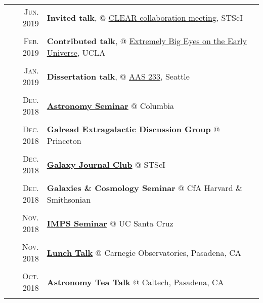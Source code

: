 \documentclass[letterpaper,10pt]{article}
\newcommand{\textwrap}{5.8in}       %
\begin{document}
\begin{longtable}{r|p{\textwrap}}
    \textsc{Jun. 2019}   &   \textbf{Invited talk}, @ \href{https://sites.google.com/view/clearhst19/home}{CLEAR collaboration meeting}, STScI \\
    \multicolumn{2}{c}{} \\

    \textsc{Feb. 2019}   &   \textbf{Contributed talk}, @ \href{https://conferences.pa.ucla.edu/early-universe-2019/agenda.html}{Extremely Big Eyes on the Early Universe}, UCLA  \\
    \multicolumn{2}{c}{} \\

    \textsc{Jan. 2019}   &   \textbf{Dissertation talk}, @ \href{https://aas.org/meetings/aas233}{AAS 233}, Seattle    \\
    \multicolumn{2}{c}{} \\

    \textsc{Dec. 2018}   &   \href{http://www.astro.columbia.edu/event?eid=584}{\textbf{Astronomy Seminar}} @ Columbia \\
    \multicolumn{2}{c}{} \\

    \textsc{Dec. 2018}   &   \href{https://web.astro.princeton.edu/node/9886}{\textbf{Galread Extragalactic Discussion Group}} @ Princeton \\
    \multicolumn{2}{c}{} \\

    \textsc{Dec. 2018}   &   \href{https://sites.google.com/site/stscigalaxyclub/}{\textbf{Galaxy Journal Club}} @ STScI \\
    \multicolumn{2}{c}{} \\

    \textsc{Dec. 2018}   &   \textbf{Galaxies \& Cosmology Seminar} @ CfA Harvard \& Smithsonian \\
    \multicolumn{2}{c}{} \\

    \textsc{Nov. 2018}   &   \href{https://docs.google.com/document/d/1fhFuTsbHO7ATeQEiBvRQ4fj_BDR7pM4HPMjxeMyEyh4/edit}{\textbf{IMPS Seminar}} @ UC Santa Cruz \\
    \multicolumn{2}{c}{} \\

    \textsc{Nov. 2018}   &   \href{https://obs.carnegiescience.edu/content/tbd-108}{\textbf{Lunch Talk}} @ Carnegie Observatories, Pasadena, CA \\
    \multicolumn{2}{c}{} \\

    \textsc{Oct. 2018}   &   \textbf{Astronomy Tea Talk} @ Caltech, Pasadena, CA \\
    \multicolumn{2}{c}{} \\


\end{longtable}
\end{document}
